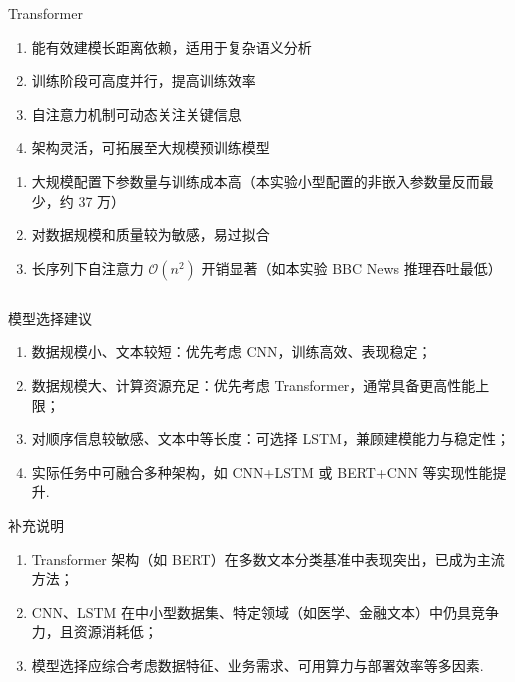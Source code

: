 \documentclass{模版}
\begin{document}
\begin{frame}
\begin{columns}[T]
\begin{block}{Transformer}
    \fontsize{8pt}{9pt}\selectfont
    \begin{enumerate}
        \item 能有效建模长距离依赖，适用于复杂语义分析
        \item 训练阶段可高度并行，提高训练效率
        \item 自注意力机制可动态关注关键信息
        \item 架构灵活，可拓展至大规模预训练模型
    \end{enumerate}
    \begin{enumerate}
        \item 大规模配置下参数量与训练成本高（本实验小型配置的非嵌入参数量反而最少，约 37 万）
        \item 对数据规模和质量较为敏感，易过拟合
        \item 长序列下自注意力 $\mathcal{O}(n^2)$ 开销显著（如本实验 BBC News 推理吞吐最低）
    \end{enumerate}
\end{block}
    \end{columns}

    \begin{block}{模型选择建议}
        \fontsize{8pt}{9pt}\selectfont
        \begin{enumerate}
            \setlength{\itemsep}{1pt}
            \item 数据规模小、文本较短：优先考虑 CNN，训练高效、表现稳定；
            \item 数据规模大、计算资源充足：优先考虑 Transformer，通常具备更高性能上限；
            \item 对顺序信息较敏感、文本中等长度：可选择 LSTM，兼顾建模能力与稳定性；
            \item 实际任务中可融合多种架构，如 CNN+LSTM 或 BERT+CNN 等实现性能提升.
        \end{enumerate}
    \end{block}

    \begin{block}{补充说明}
        \fontsize{8pt}{9pt}\selectfont
        \begin{enumerate}
            \setlength{\itemsep}{1pt}
            \item Transformer 架构（如 BERT）在多数文本分类基准中表现突出，已成为主流方法；
            \item CNN、LSTM 在中小型数据集、特定领域（如医学、金融文本）中仍具竞争力，且资源消耗低；
            \item 模型选择应综合考虑数据特征、业务需求、可用算力与部署效率等多因素.
        \end{enumerate}
    \end{block}
\end{frame}
\end{document}
